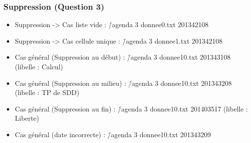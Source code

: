 \documentclass{report}
\begin{document}
\subsubsection{Suppression (Question 3)}
\begin{itemize}

    \item Suppression -> Cas liste vide : \./agenda 3 donnee0.txt 201342108
\vspace{0.5cm}

\vspace{0.5cm}

    \item Suppression -> Cas cellule unique : \./agenda 3 donnee1.txt 201342108
\vspace{0.5cm}

\vspace{0.5cm}

    \item Cas général (Suppression au début) : \./agenda 3 donnee10.txt 201343108 (libelle : Calcul)
\vspace{0.5cm}

\vspace{0.5cm}

    \item Cas général (Suppression au milieu) : \./agenda 3 donnee10.txt 201343208 (libelle : TP de SDD)
\vspace{0.5cm}

\vspace{0.5cm}

    \item Cas général (Suppression au fin) : \./agenda 3 donnee10.txt 201403517 (libelle : Liberte)
\vspace{0.5cm}

\vspace{0.5cm}

    \item Cas général (date incorrecte) : \./agenda 3 donnee10.txt 201343209
\vspace{0.5cm}

\end{itemize}

\newpage
\end{document}
